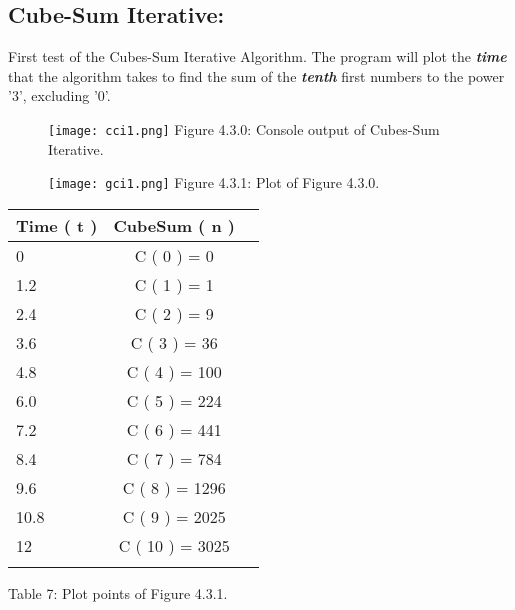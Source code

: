 \documentclass[10pt,a4paper]{article}
\begin{document}
\pagebreak

\subsection{Cube-Sum Iterative:}

First test of the Cubes-Sum Iterative Algorithm. The program will plot the {\bfseries\itshape time} that the algorithm takes to find the sum of the {\bfseries\itshape tenth} first numbers to the power '3', excluding '0'.

\begin{figure}[H]
\texttt{[image: cci1.png]}
\centering \linebreak \linebreak Figure 4.3.0: Console output of Cubes-Sum Iterative.
\end{figure}

\begin{multicols}{2}
\begin{figure}[H]
\texttt{[image: gci1.png]}
\centering \linebreak \linebreak Figure 4.3.1: Plot of Figure 4.3.0.
\end{figure}

\begin{center}
\begin{itemize}
\end{itemize}
\begin{tabular}[.5cm]{l c c }
\toprule
Time ( t ) & CubeSum ( n ) \\
\midrule
0 & C ( 0 ) = 0 \\
\cmidrule{1-2}
1.2 & C ( 1 ) = 1 \\
\cmidrule{1-2}
2.4 & C ( 2 ) = 9 \\
\cmidrule{1-2}
3.6 & C ( 3 ) = 36 \\
\cmidrule{1-2}
4.8 & C ( 4 ) = 100 \\
\cmidrule{1-2}
6.0 & C ( 5 ) = 224 \\
\cmidrule{1-2}
7.2 & C ( 6 ) = 441 \\
\cmidrule{1-2}
8.4 & C ( 7 ) = 784 \\
\cmidrule{1-2}
9.6 & C ( 8 ) = 1296 \\
\cmidrule{1-2}
10.8 & C ( 9 ) = 2025 \\
\cmidrule{1-2}
12 & C ( 10 ) = 3025 \\
\bottomrule
\linebreak
\end{tabular}
\linebreak Table 7: Plot points of Figure 4.3.1.
\end{center}
\end{multicols}
\end{document}
